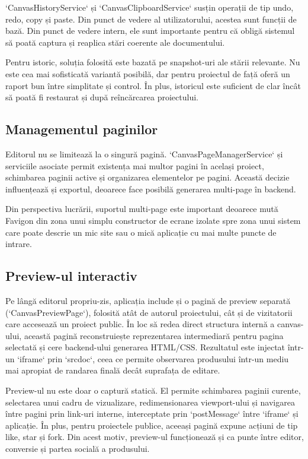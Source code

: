 `CanvasHistoryService` și `CanvasClipboardService` susțin operații de tip undo, redo, copy și paste. Din punct de vedere al utilizatorului, acestea sunt funcții de bază. Din punct de vedere intern, ele sunt importante pentru că obligă sistemul să poată captura și reaplica stări coerente ale documentului.

Pentru istoric, soluția folosită este bazată pe snapshot-uri ale stării relevante. Nu este cea mai sofisticată variantă posibilă, dar pentru proiectul de față oferă un raport bun între simplitate și control. În plus, istoricul este suficient de clar încât să poată fi restaurat și după reîncărcarea proiectului.

\subsection{Managementul paginilor}

Editorul nu se limitează la o singură pagină. `CanvasPageManagerService` și serviciile asociate permit existența mai multor pagini în același proiect, schimbarea paginii active și organizarea elementelor pe pagini. Această decizie influențează și exportul, deoarece face posibilă generarea multi-page în backend.

Din perspectiva lucrării, suportul multi-page este important deoarece mută Favigon din zona unui simplu constructor de ecrane izolate spre zona unui sistem care poate descrie un mic site sau o mică aplicație cu mai multe puncte de intrare.

\subsection{Preview-ul interactiv}

Pe lângă editorul propriu-zis, aplicația include și o pagină de preview separată (`CanvasPreviewPage`), folosită atât de autorul proiectului, cât și de vizitatorii care accesează un proiect public. În loc să redea direct structura internă a canvas-ului, această pagină reconstruiește reprezentarea intermediară pentru pagina selectată și cere backend-ului generarea HTML/CSS. Rezultatul este injectat într-un `iframe` prin `srcdoc`, ceea ce permite observarea produsului într-un mediu mai apropiat de randarea finală decât suprafața de editare.

Preview-ul nu este doar o captură statică. El permite schimbarea paginii curente, selectarea unui cadru de vizualizare, redimensionarea viewport-ului și navigarea între pagini prin link-uri interne, interceptate prin `postMessage` între `iframe` și aplicație. În plus, pentru proiectele publice, aceeași pagină expune acțiuni de tip like, star și fork. Din acest motiv, preview-ul funcționează și ca punte între editor, conversie și partea socială a produsului.


